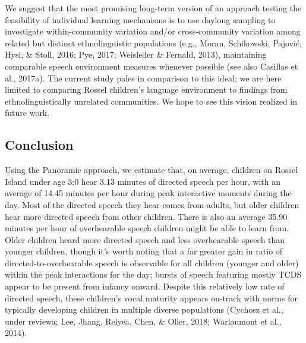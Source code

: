\documentclass[,man,mask,floatsintext]{apa6}
\begin{document}
We suggest that the most promising long-term version of an approach
testing the feasibility of individual learning mechanisms is to use
daylong sampling to investigate within-community variation and/or
cross-community variation among related but distinct ethnolinguistic
populations (e.g., Moran, Schikowski, Pajović, Hysi, \& Stoll, 2016;
Pye, 2017; Weisleder \& Fernald, 2013), maintaining comparable speech
environment measures whenever possible (see also Casillas et al.,
2017a). The current study pales in comparison to this ideal; we are here
limited to comparing Rossel children's language environment to findings
from ethnolinguistically unrelated communities. We hope to see this
vision realized in future work.

\subsection{Conclusion}\label{disc-conclusion}

Using the Panoramic approach, we estimate that, on average, children on
Rossel Island under age 3;0 hear 3.13 minutes of directed speech per
hour, with an average of 14.45 minutes per hour during peak interactive
moments during the day. Most of the directed speech they hear comes from
adults, but older children hear more directed speech from other
children. There is also an average 35.90 minutes per hour of
overhearable speech children might be able to learn from. Older children
heard more directed speech and less overhearable speech than younger
children, though it's worth noting that a far greater gain in ratio of
directed-to-overhearable speech is observable for all children (younger
and older) within the peak interactions for the day; bursts of speech
featuring mostly TCDS appear to be present from infancy onward. Despite
this relatively low rate of directed speech, these children's vocal
maturity appears on-track with norms for typically developing children
in multiple diverse populations (Cychosz et al., under reviewa; Lee,
Jhang, Relyea, Chen, \& Oller, 2018; Warlaumont et al., 2014).
\end{document}
